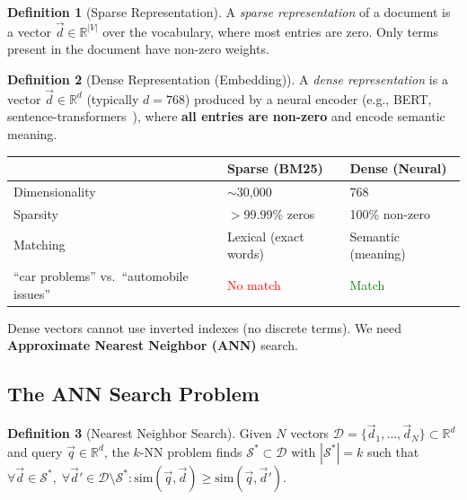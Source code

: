 \documentclass[11pt,a4paper]{article}
\theoremstyle{definition}
\newtheorem{definition}{Definition}[section]
\theoremstyle{plain}
\begin{document}
\begin{definition}[Sparse Representation]
A \emph{sparse representation} of a document is a vector $\vec{d} \in \mathbb{R}^{|V|}$ over the vocabulary, where most entries are zero. Only terms present in the document have non-zero weights.
\end{definition}

\begin{definition}[Dense Representation (Embedding)]
A \emph{dense representation} is a vector $\vec{d} \in \mathbb{R}^{d}$ (typically $d = 768$) produced by a neural encoder (e.g., BERT, sentence-transformers~\cite{reimers2019sentence}), where \textbf{all entries are non-zero} and encode semantic meaning.
\end{definition}

\begin{center}
\begin{tabular}{lll}
\toprule
& \textbf{Sparse (BM25)} & \textbf{Dense (Neural)} \\
\midrule
Dimensionality & $\sim$30,000 & 768 \\
Sparsity & $>$99.99\% zeros & 100\% non-zero \\
Matching & Lexical (exact words) & Semantic (meaning) \\
``car problems'' vs.\ ``automobile issues'' & \textcolor{red}{No match} & \textcolor{green}{Match} \\
\bottomrule
\end{tabular}
\end{center}

Dense vectors cannot use inverted indexes (no discrete terms). We need \textbf{Approximate Nearest Neighbor (ANN)} search.

\begin{center}

\end{center}

\subsection{The ANN Search Problem}

\begin{definition}[Nearest Neighbor Search]
Given $N$ vectors $\mathcal{D} = \{\vec{d}_1, \ldots, \vec{d}_N\} \subset \mathbb{R}^d$ and query $\vec{q} \in \mathbb{R}^d$, the $k$-NN problem finds $\mathcal{S}^* \subset \mathcal{D}$ with $|\mathcal{S}^*| = k$ such that $\forall \vec{d} \in \mathcal{S}^*,\; \forall \vec{d}' \in \mathcal{D} \setminus \mathcal{S}^*: \mathrm{sim}(\vec{q}, \vec{d}) \geq \mathrm{sim}(\vec{q}, \vec{d}')$.
\end{definition}
\end{document}
